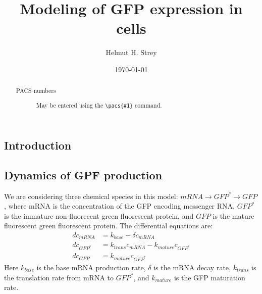 \documentclass[%
 reprint,
 amsmath,amssymb,
 aps,
]{revtex4-1}
\begin{document}

\title{Modeling of GFP expression in cells}

\author{Helmut H. Strey}

\date{\today}%

\begin{abstract}
\begin{description}
\item[PACS numbers]
May be entered using the \verb+\pacs{#1}+ command.
\end{description}
\end{abstract}

\maketitle

\onecolumngrid
\subsection{Introduction}


\subsection{Dynamics of GPF production}
We are considering three chemical species in this model: $mRNA \rightarrow GFP^{*} \rightarrow GFP$, where mRNA is the concentration of the GFP encoding messenger RNA, $GFP^{*}$ is the immature non-fluorecent green fluorescent protein, and $GFP$ is the mature fluorescent green fluorescent protein.
The differential equations are:
\begin{equation}
	\begin{aligned}
	dc_{mRNA} &= k_{base} - \delta c_{mRNA} \\
	dc_{GFP^{*}} &= k_{trans} c_{mRNA} - k_{mature} c_{GFP^{*}}\\
	dc_{GFP} &= k_{mature} c_{GFP^{*}}
	\end{aligned}
\end{equation}
Here $k_{base}$ is the base mRNA production rate, $\delta$ is the mRNA decay rate, $k_{trans}$ is the translation rate from mRNA to $GFP^*$, and $k_{mature}$ is the GFP maturation rate.
\begin{acknowledgments}

\end{acknowledgments}
\end{document}
